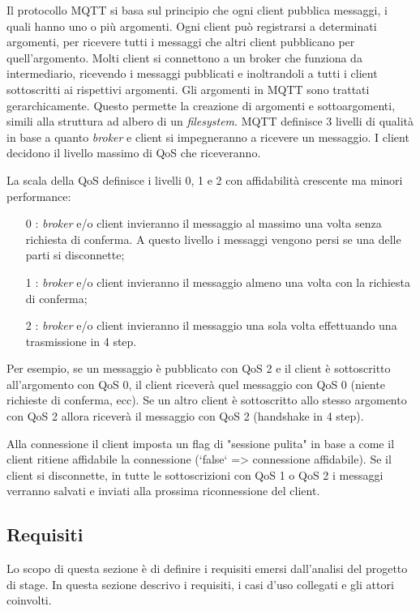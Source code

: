 Il protocollo MQTT si basa sul principio che ogni client pubblica messaggi, i quali hanno uno o più argomenti.
Ogni client può registrarsi a determinati argomenti, per ricevere tutti i messaggi che altri client pubblicano per quell'argomento. Molti client si connettono a un  \gls{broker} che funziona da intermediario, ricevendo i messaggi pubblicati e inoltrandoli a tutti i client sottoscritti ai rispettivi argomenti.
Gli argomenti in MQTT sono trattati gerarchicamente. Questo permette la creazione di argomenti e sottoargomenti, simili alla struttura ad albero di un \emph{filesystem}.
MQTT definisce 3 livelli di qualità in base a quanto \emph{broker} e client si impegneranno a ricevere un messaggio.
I client decidono il livello massimo di QoS che riceveranno.

La scala della QoS definisce i livelli 0, 1 e 2 con affidabilità crescente ma minori performance:
\begin{itemize}
	\item [0]: \emph{broker} e/o client invieranno il messaggio al massimo una volta senza richiesta di conferma. A questo livello i messaggi vengono persi se una delle parti si disconnette;
	\item [1]: \emph{broker} e/o client invieranno il messaggio almeno una volta con la richiesta di conferma;
	\item [2]: \emph{broker} e/o client invieranno il messaggio una sola volta effettuando una trasmissione in 4 step.
\end{itemize}

Per esempio, se un messaggio è pubblicato con QoS 2 e il client è sottoscritto all'argomento con QoS 0, il client riceverà quel messaggio con QoS 0 (niente richieste di conferma, ecc).
Se un altro client è sottoscritto allo stesso argomento con QoS 2 allora riceverà il messaggio con QoS 2 (handshake in 4 step).

Alla connessione il client imposta un flag di "sessione pulita" in base a come il client ritiene affidabile la connessione (`false` => connessione affidabile). Se il client si disconnette, in tutte le sottoscrizioni con QoS 1 o QoS 2 i messaggi verranno salvati e inviati alla prossima riconnessione del client.

\subsection{Requisiti}

Lo scopo di questa sezione è di definire i requisiti emersi dall’analisi del progetto di stage.
In questa sezione descrivo i requisiti, i casi d'uso collegati e gli attori coinvolti.

